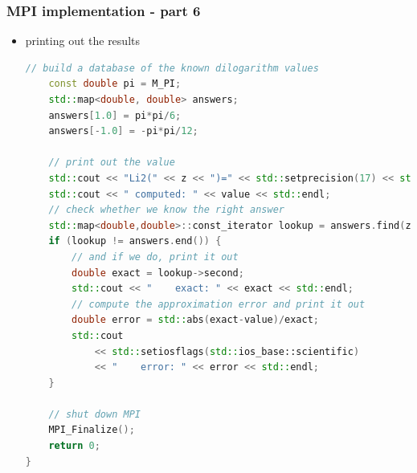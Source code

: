 \begin{frame}[fragile]
%
  \frametitle{MPI implementation - part 6}
%
  \begin{itemize}
  \item printing out the results
  \begin{lstlisting}[language=c++,name=mpi]
    // build a database of the known dilogarithm values
    const double pi = M_PI;
    std::map<double, double> answers;
    answers[1.0] = pi*pi/6;
    answers[-1.0] = -pi*pi/12;

    // print out the value
    std::cout << "Li2(" << z << ")=" << std::setprecision(17) << std::endl;
    std::cout << " computed: " << value << std::endl;
    // check whether we know the right answer
    std::map<double,double>::const_iterator lookup = answers.find(z);
    if (lookup != answers.end()) {
        // and if we do, print it out
        double exact = lookup->second;
        std::cout << "    exact: " << exact << std::endl;
        // compute the approximation error and print it out
        double error = std::abs(exact-value)/exact;
        std::cout 
            << std::setiosflags(std::ios_base::scientific) 
            << "    error: " << error << std::endl;
    }

    // shut down MPI
    MPI_Finalize();
    return 0;
}
  \end{lstlisting}
%
  \end{itemize}
%
\end{frame}



